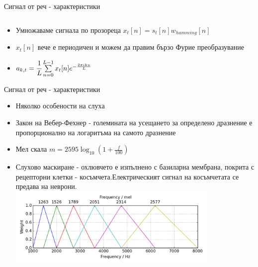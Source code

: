 \documentclass[9pt]{beamer}
\newcommand{\B}[1]{\left(#1\right)}
\begin{document}
\begin{frame}[t]{Сигнал от реч - характеристики}
\begin{columns}[t]
\begin{column}{0.48\textwidth}
            \end{column}
        \end{columns}
        \pause
        \begin{itemize}
            \item Умножаваме сигнала по прозореца $x_t[n] = s_t[n]w_{hamming}[n]$
            \pause
            \item $x_t[n]$ вече е периодичен и можем да правим бързо Фурие преобразувание
            \pause
            \item $a_{k, t} = \cfrac{1}{L} \sum\limits_{n=0}^{L-1} x_t[n] e^{-\frac{2\pi i k n}{L}}$
        \end{itemize}
    \end{frame}

    
    \begin{frame}[t]{Сигнал от реч - характеристики}
        \pause
        \begin{itemize}
            \item Няколко особености на слуха
            \pause
            \item Закон на Вебер-Фехнер
            \pause - големината на усещането за определено дразнение е пропорционално на логаритъма на самото дразнение
            \pause
            \item Мел скала
            \pause $m = 2595 \log_10\B{1 + \frac{f}{100}}$
            \pause
            \item Слухово маскиране
            \pause - охлювчето е изпълнено с базиларна мембрана, покрита с рецепторни клетки - косъмчета.\pause  Електрическият сигнал на косъмчетата се предава на неврони.
            \pause
            \includegraphics[width=0.8\textwidth]{mel_filterbank}%
        \end{itemize}
    \end{frame}
\end{document}
